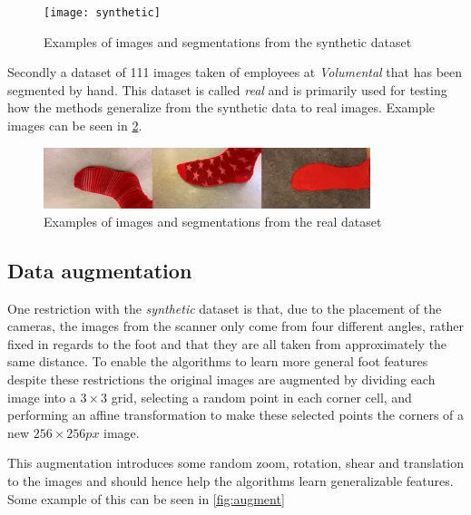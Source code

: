 \documentclass{kththesis}
\begin{document}
\begin{figure}[h]
  \centering
  \texttt{[image: synthetic]}
  \caption{Examples of images and segmentations from the synthetic dataset}
  \label{fig:data_synthetic}
\end{figure}

Secondly a dataset of 111 images taken of employees at \textit{Volumental} that
has been segmented by hand. This dataset is called \textit{real} and is
primarily used for testing how the methods generalize from  the synthetic data to
real images. Example images can be seen in \cref{fig:data_real}.

\begin{figure}[h]
  \centering
  \includegraphics[width=0.85\textwidth]{real}
  \caption{Examples of images and segmentations from the real dataset}
  \label{fig:data_real}
\end{figure}

\subsection{Data augmentation}
One restriction with the \textit{synthetic} dataset is that, due to the
placement of the cameras, the images from the
scanner only come from four different angles, rather fixed in regards to the
foot and that they are all taken from approximately the same
distance. To enable the algorithms to learn more general foot features despite
these restrictions the original images are augmented by dividing each image into
a \(3\times3\) grid, selecting a random point in each corner cell, and
performing an affine transformation to make these selected points the corners of
a new \(256\times256 \textit{px}\) image.

This augmentation introduces some random zoom, rotation, shear and translation
to the images and should hence help the algorithms learn generalizable features.
Some example of this can be seen in \cref{fig:augment}
\end{document}
